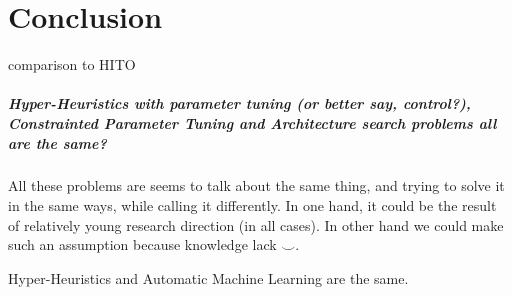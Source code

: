 \chapter{Conclusion}
comparison to HITO~\cite{guizzo2015hyper}


\paragraph{Hyper-Heuristics with parameter tuning (or better say, control?), Constrainted Parameter Tuning and Architecture search problems all are the same?}
All these problems are seems to talk about the same thing, and trying to solve it in the same ways, while calling it differently. In one hand, it could be the result of relatively young research direction (in all cases). In other hand we could make such an assumption because knowledge lack $\smile$.

Hyper-Heuristics and Automatic Machine Learning are the same.